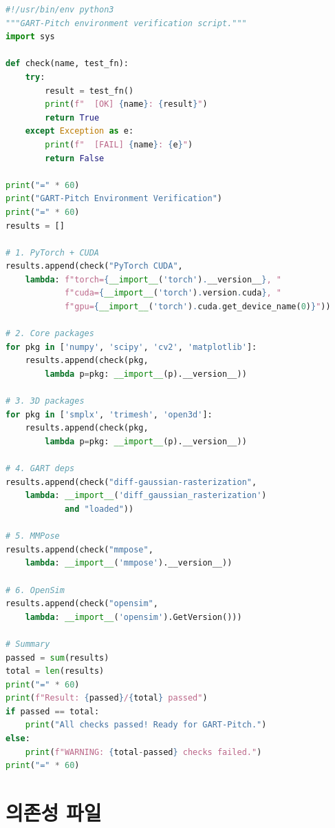 \documentclass[11pt, a4paper]{report}
\begin{document}
\begin{termbox}[title={전체 환경 검증 스크립트 (\texttt{test\_env.py})}]
\begin{lstlisting}[language=Python]
#!/usr/bin/env python3
"""GART-Pitch environment verification script."""
import sys

def check(name, test_fn):
    try:
        result = test_fn()
        print(f"  [OK] {name}: {result}")
        return True
    except Exception as e:
        print(f"  [FAIL] {name}: {e}")
        return False

print("=" * 60)
print("GART-Pitch Environment Verification")
print("=" * 60)
results = []

# 1. PyTorch + CUDA
results.append(check("PyTorch CUDA",
    lambda: f"torch={__import__('torch').__version__}, "
            f"cuda={__import__('torch').version.cuda}, "
            f"gpu={__import__('torch').cuda.get_device_name(0)}"))

# 2. Core packages
for pkg in ['numpy', 'scipy', 'cv2', 'matplotlib']:
    results.append(check(pkg,
        lambda p=pkg: __import__(p).__version__))

# 3. 3D packages
for pkg in ['smplx', 'trimesh', 'open3d']:
    results.append(check(pkg,
        lambda p=pkg: __import__(p).__version__))

# 4. GART deps
results.append(check("diff-gaussian-rasterization",
    lambda: __import__('diff_gaussian_rasterization')
            and "loaded"))

# 5. MMPose
results.append(check("mmpose",
    lambda: __import__('mmpose').__version__))

# 6. OpenSim
results.append(check("opensim",
    lambda: __import__('opensim').GetVersion()))

# Summary
passed = sum(results)
total = len(results)
print("=" * 60)
print(f"Result: {passed}/{total} passed")
if passed == total:
    print("All checks passed! Ready for GART-Pitch.")
else:
    print(f"WARNING: {total-passed} checks failed.")
print("=" * 60)
\end{lstlisting}
\end{termbox}


\chapter{의존성 파일}
\label{ch:requirements}
\end{document}
